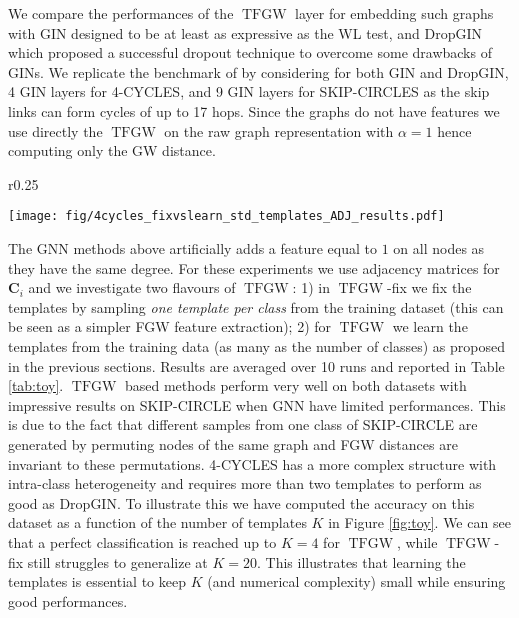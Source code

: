 \documentclass{article}
\def\mC{{\bm{C}}}
\newcommand{\TFGW}{\operatorname{TFGW}}
\begin{document}
We compare the performances of the $\TFGW$ layer for embedding such graphs with GIN \cite{xu2018powerful} designed to be at least as expressive
as the WL test, and DropGIN \cite{papp2021dropgnn} which proposed a successful dropout technique to overcome some drawbacks of GINs.
We replicate the benchmark
of \cite{papp2021dropgnn} by considering 
for both GIN and DropGIN, 4 GIN layers for 4-CYCLES, and 9 GIN
layers for SKIP-CIRCLES as the skip links can form cycles of up to 17 hops. Since the graphs do not have features we use
directly the $\TFGW$ on the raw graph representation with $\alpha=1$ hence computing
only the GW distance.\begin{wrapfigure}{r}{0.25\textwidth}  \vspace{-5mm}
	\begin{center}
		\texttt{[image: fig/4cycles\_fixvslearn\_std\_templates\_ADJ\_results.pdf]}
	\end{center}
	\vspace{-4mm}
	\caption{\label{fig:toy}Test accuracy distributions by number of templates either fixed or learned.} 
\end{wrapfigure} The GNN methods above artificially adds a feature equal to $1$ on all nodes as they have the same degree. For these experiments we use adjacency
matrices for $\mC_i$ and we investigate two flavours of $\TFGW$: 1) in $\TFGW$-fix we fix the
templates by sampling \emph{one template per class} from the training dataset (this can be seen as a simpler FGW feature extraction);
2) for $\TFGW$ we learn the templates from the training
data (as many as the number of classes) as proposed in the previous sections. Results are averaged over 10 runs and reported in
Table \ref{tab:toy}. $\TFGW$ based methods perform very well on both datasets with
impressive results on SKIP-CIRCLE when GNN have limited performances. This is due to the fact that different samples from one class of SKIP-CIRCLE are generated by permuting nodes of the same graph and FGW distances are invariant to these permutations.
4-CYCLES has a more complex structure with intra-class
heterogeneity and requires more than two templates to perform as good as DropGIN. To illustrate this we have computed the accuracy on this dataset as a
function of the number of templates $K$ in Figure \ref{fig:toy}. We can see that a perfect
classification is reached up to $K=4$ for $\TFGW$, while $\TFGW$-fix still
struggles to generalize at $K=20$. This illustrates that
learning the templates is essential to keep $K$ (and numerical complexity) small
while ensuring good performances. 
\end{document}
